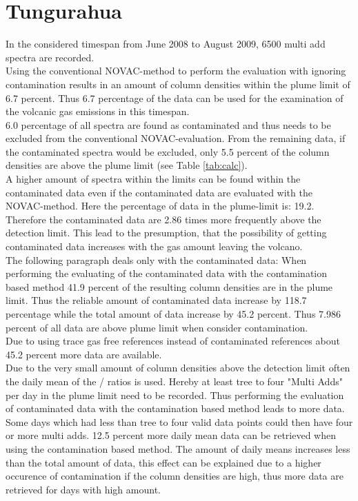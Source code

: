 \documentclass  [
  paper    = a4,
  BCOR     = 10mm,
  twoside,
  fontsize = 12pt,
  fleqn,
  toc      = bibnumbered,
  toc      = listofnumbered,
  numbers  = noendperiod,
  headings = normal,
  listof   = leveldown,
  version  = 3.03
]                                       {scrreprt}
\begin{document}
\section{Tungurahua}
	In the considered timespan from June 2008 to August 2009, 6500 multi add spectra are recorded. \\
	Using the conventional NOVAC-method to perform the evaluation with ignoring contamination results in an amount of    column densities within the plume limit of 6.7 percent. Thus 6.7 percentage of the data can be used for the examination of the volcanic gas emissions in this timespan.\\
 	6.0 percentage of all spectra are found as contaminated and thus needs to be excluded from the conventional NOVAC-evaluation. From the remaining data,  if the contaminated spectra would be excluded, only 5.5 percent of the   column densities are above the plume limit  (see  Table \ref{tab:calc}). \\
 	A higher amount of spectra within the   limits can be found within the contaminated data even if the contaminated data are evaluated with the NOVAC-method. Here the percentage of data in the plume-limit is: 19.2.
 	Therefore the contaminated data are 2.86 times more frequently above the detection limit. This lead to the presumption, that the possibility of getting contaminated data increases with the gas amount leaving the volcano.\\
 	The following paragraph deals only with the contaminated data:	
 	When performing the evaluating of the contaminated data with the contamination based method 41.9 percent of the resulting   column densities are in the plume limit. Thus the reliable amount of contaminated data increase by 118.7 percentage while the total amount of data increase by 45.2 percent. Thus 7.986 percent of all data are above plume limit when consider contamination.\\
 	Due to using trace gas free references instead of contaminated references about 45.2 percent more data are available. \\
 	Due to the very small amount of   column densities above the detection limit often the daily mean of the /  ratios is used. Hereby at least tree to four "Multi Adds" per day in the plume limit need to be recorded. Thus performing the evaluation of contaminated data with the contamination based method leads to more data. Some days which had less than  tree to four valid data points could then have four or more multi adds. 12.5 percent more daily mean data can be retrieved when using the contamination based method. The amount of daily means increases less than the total amount of data, this effect can be explained due to a higher occurence of contamination if the   column densities are high, thus more data are retrieved for days with high   amount.
\end{document}

